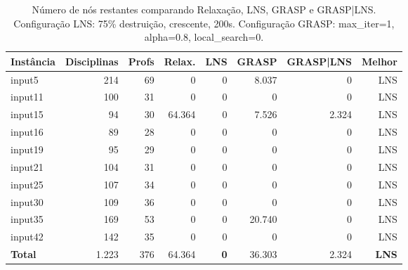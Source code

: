 \begin{table}[htbp]
\centering
\caption{Número de nós restantes comparando Relaxação, LNS, GRASP e GRASP|LNS. Configuração LNS: 75\% destruição, crescente, 200s. Configuração GRASP: max\_iter=1, alpha=0.8, local\_search=0.}
\label{tab:geral_nodes}
\small
\begin{tabular}{@{}lrrrrrrr@{}}
\toprule
\textbf{Instância} & \textbf{Disciplinas} & \textbf{Profs} & \textbf{Relax.} & \textbf{LNS} & \textbf{GRASP} & \textbf{GRASP|LNS} & \textbf{Melhor} \\
\midrule
input5  & 214 & 69 & 0      & 0      & 8.037  & 0 & LNS \\
input11 & 100 & 31 & 0      & 0      & 0      & 0 & LNS \\
input15 & 94  & 30 & 64.364 & 0      & 7.526  & 2.324 & LNS \\
input16 & 89  & 28 & 0      & 0      & 0      & 0 & LNS \\
input19 & 95  & 29 & 0      & 0      & 0      & 0 & LNS \\
input21 & 104 & 31 & 0      & 0      & 0      & 0 & LNS \\
input25 & 107 & 34 & 0      & 0      & 0      & 0 & LNS \\
input30 & 109 & 36 & 0      & 0      & 0      & 0 & LNS \\
input35 & 169 & 53 & 0      & 0      & 20.740 & 0 & LNS \\
input42 & 142 & 35 & 0      & 0      & 0      & 0 & LNS \\
\midrule
\textbf{Total} & 1.223 & 376	& 64.364	& \textbf{0}	& 36.303	& 2.324 & \textbf{LNS} \\
\bottomrule
\end{tabular}
\end{table}

